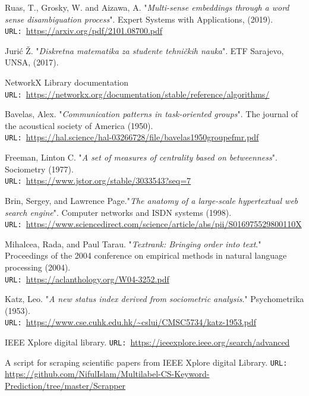\documentclass[12pt]{article}
\numberwithin{equation}{section}
\begin{document}
\begin{spacing}{1.5}
\begin{thebibliography}{8}
		Ruas, T., Grosky, W. and Aizawa, A.  "\textit{Multi-sense embeddings through a word sense disambiguation process}". Expert Systems with Applications,  (2019). \\
		\texttt{URL: }\url{https://arxiv.org/pdf/2101.08700.pdf}
		
		Jurić Ž. "\textit{Diskretna matematika za studente tehničkih nauka}". ETF Sarajevo, UNSA, (2017). 
		
		NetworkX Library documentation\\
		\texttt{URL: }\url{https://networkx.org/documentation/stable/reference/algorithms/}
		
		Bavelas, Alex. "\textit{Communication patterns in task‐oriented groups}". The journal of the acoustical society of America (1950). \\
		\texttt{URL: }\url{https://hal.science/hal-03266728/file/bavelas1950groupefmr.pdf}
		
		Freeman, Linton C. "\textit{A set of measures of centrality based on betweenness}". Sociometry (1977). \\
		\texttt{URL: }\url{https://www.jstor.org/stable/3033543?seq=7}
		
		Brin, Sergey, and Lawrence Page."\textit{The anatomy of a large-scale hypertextual web search engine}". Computer networks and ISDN systems (1998). \\
		\texttt{URL: }\url{https://www.sciencedirect.com/science/article/abs/pii/S016975529800110X}
		
		Mihalcea, Rada, and Paul Tarau. "\textit{Textrank: Bringing order into text}." Proceedings of the 2004 conference on empirical methods in natural language processing (2004). \\
		\texttt{URL: }\url{https://aclanthology.org/W04-3252.pdf}
		
		Katz, Leo. "\textit{A new status index derived from sociometric analysis}." Psychometrika (1953). \\
		\texttt{URL: }\url{https://www.cse.cuhk.edu.hk/~cslui/CMSC5734/katz-1953.pdf}
		
		IEEE Xplore digital library.
		\texttt{URL: }\url{https://ieeexplore.ieee.org/search/advanced}
		
		A script for scraping scientific papers from IEEE Xplore digital Library.
		\texttt{URL: }\url{https://github.com/NifulIslam/Multilabel-CS-Keyword-Prediction/tree/master/Scrapper}
		

\end{thebibliography}
\end{spacing}
\end{document}

